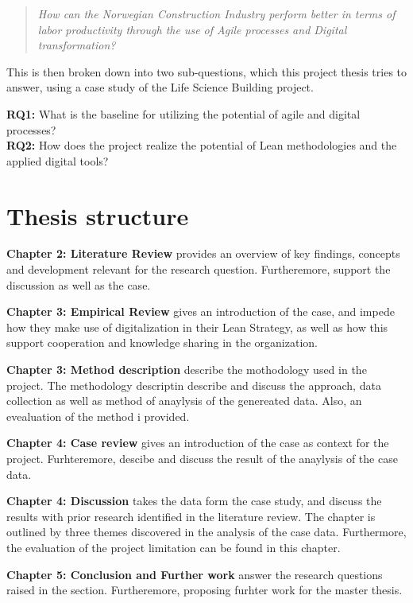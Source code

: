 \begin{quote}
    \textit{How can the Norwegian Construction Industry perform better in terms of labor productivity through the use of Agile processes and Digital transformation?} 
\end{quote}

This is then broken down into two sub-questions, which this project thesis tries to answer, using a case study of the Life Science Building project.

{\noindent \bf RQ1:} What is the baseline for utilizing the potential of agile and digital processes? \\
{\noindent \bf RQ2:} How does the project realize the potential of Lean methodologies and the applied digital tools?

\section{Thesis structure} \label{sec:thesis}

{\noindent \bf Chapter 2: Literature Review} provides an overview of key findings, concepts and development relevant for the research question. Furtheremore, support the discussion as well as the case. 

{\noindent \bf Chapter 3: Empirical Review} gives an introduction of the case, and impede how they make use of digitalization in their Lean Strategy, as well as how this support cooperation and knowledge sharing in the organization.

{\noindent \bf Chapter 3: Method description} describe the mothodology used in the project. The methodology descriptin describe and discuss the approach, data collection as well as method of anaylysis of the genereated data. Also, an evealuation of the method i provided.

{\noindent \bf Chapter 4: Case review} gives an introduction of the case as context for the project. Furhteremore, descibe and discuss the result of the anaylysis of the case data. 

{\noindent \bf Chapter 4: Discussion} takes the data form the case study, and discuss the results with prior research identified in the literature review. The chapter is outlined by three themes discovered in the analysis of the case data. Furthermore, the evaluation of the project limitation can be found in this chapter.

{\noindent \bf Chapter 5: Conclusion and Further work} answer the research questions raised in the  section. Furtheremore, proposing furhter work for the master thesis.


\cleardoublepage